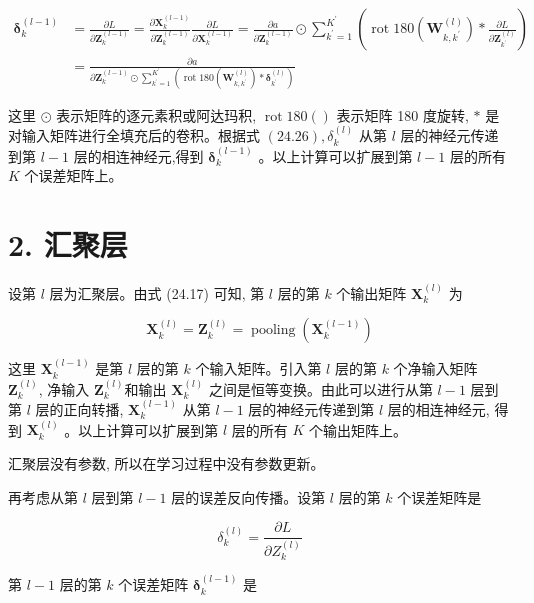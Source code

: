 \documentclass[10pt]{article}
\begin{document}
\begin{align*}
\boldsymbol{\delta}_{k}^{(l-1)} & =\frac{\partial L}{\partial \boldsymbol{Z}_{k}^{(l-1)}}=\frac{\partial \boldsymbol{X}_{k}^{(l-1)}}{\partial \boldsymbol{Z}_{k}^{(l-1)}} \frac{\partial L}{\partial \boldsymbol{X}_{k}^{(l-1)}}=\frac{\partial a}{\partial \boldsymbol{Z}_{k}^{(l-1)}} \odot \sum_{k^{\prime}=1}^{K^{\prime}}\left(\operatorname{rot} 180\left(\boldsymbol{W}_{k, k^{\prime}}^{(l)}\right) * \frac{\partial L}{\partial \boldsymbol{Z}_{k^{\prime}}^{(l)}}\right) \\
& =\frac{\partial a}{\partial \boldsymbol{Z}_{k}^{(l-1)} \odot \sum_{k^{\prime}=1}^{K^{\prime}}\left(\operatorname{rot} 180\left(\boldsymbol{W}_{k, k^{\prime}}^{(l)}\right) * \boldsymbol{\delta}_{k^{\prime}}^{(l)}\right)} \tag{24.26}
\end{align*}


这里 $\odot$ 表示矩阵的逐元素积或阿达玛积, $\operatorname{rot} 180()$ 表示矩阵 180 度旋转, $*$ 是对输入矩阵进行全填充后的卷积。根据式 $(24.26), \delta_{k}^{(l)}$ 从第 $l$ 层的神经元传递到第 $l-1$ 层的相连神经元,得到 $\boldsymbol{\delta}_{k}^{(l-1)}$ 。以上计算可以扩展到第 $l-1$ 层的所有 $K$ 个误差矩阵上。

\section*{2. 汇聚层}
设第 $l$ 层为汇聚层。由式 (24.17) 可知, 第 $l$ 层的第 $k$ 个输出矩阵 $\boldsymbol{X}_{k}^{(l)}$ 为

$$
\boldsymbol{X}_{k}^{(l)}=\boldsymbol{Z}_{k}^{(l)}=\operatorname{pooling}\left(\boldsymbol{X}_{k}^{(l-1)}\right)
$$

这里 $\boldsymbol{X}_{k}^{(l-1)}$ 是第 $l$ 层的第 $k$ 个输入矩阵。引入第 $l$ 层的第 $k$ 个净输入矩阵 $\boldsymbol{Z}_{k}^{(l)}$, 净输入 $\boldsymbol{Z}_{k}^{(l)}$和输出 $\boldsymbol{X}_{k}^{(l)}$ 之间是恒等变换。由此可以进行从第 $l-1$ 层到第 $l$ 层的正向转播, $\boldsymbol{X}_{k}^{(l-1)}$ 从第 $l-1$ 层的神经元传递到第 $l$ 层的相连神经元, 得到 $\boldsymbol{X}_{k}^{(l)}$ 。以上计算可以扩展到第 $l$ 层的所有 $K$ 个输出矩阵上。

汇聚层没有参数, 所以在学习过程中没有参数更新。

再考虑从第 $l$ 层到第 $l-1$ 层的误差反向传播。设第 $l$ 层的第 $k$ 个误差矩阵是

$$
\delta_{k}^{(l)}=\frac{\partial L}{\partial Z_{k}^{(l)}}
$$

第 $l-1$ 层的第 $k$ 个误差矩阵 $\boldsymbol{\delta}_{k}^{(l-1)}$ 是
\end{document}
